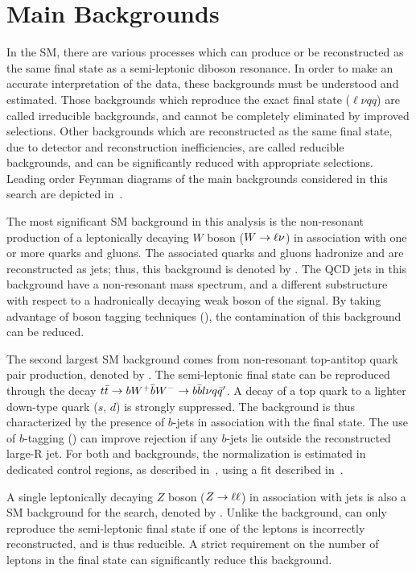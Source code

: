 %
\section{Main Backgrounds}
\label{ch:analysisStrategy:bkgs}
In the SM, there are various processes which can produce or be reconstructed as the same final state as a semi-leptonic diboson resonance. In order to make an accurate interpretation of the data, these backgrounds must be understood and estimated. Those backgrounds which reproduce the exact final state ($\ell\nu qq$) are called irreducible backgrounds, and cannot be completely eliminated by improved selections. Other backgrounds which are reconstructed as the same final state, due to detector and reconstruction inefficiencies, are called reducible backgrounds, and can be significantly reduced with appropriate selections. Leading order Feynman diagrams of the main backgrounds considered in this search are depicted in~\Fig{\ref{fig:bkg_feyn_lo}}.

The most significant SM background in this analysis is the non-resonant production of a leptonically decaying $W$ boson ($W\rightarrow\ell \nu$) in association with one or more quarks and gluons. The associated quarks and gluons hadronize and are reconstructed as jets; thus, this background is denoted by \Wjets. The QCD jets in this background have a non-resonant mass spectrum, and a different substructure with respect to a hadronically decaying weak boson of the signal. By taking advantage of boson tagging techniques (\Sect{\ref{ch:objectReconstruction:larger}}), the contamination of this background can be reduced. 

The second largest SM background comes from non-resonant top-antitop quark pair production, denoted by \ttbar. The semi-leptonic final state can be reproduced through the decay $t\bar{t} \rightarrow bW^+\bar{b}W^- \rightarrow b\bar{b}l\nu q\bar{q}'$. A decay of a top quark to a lighter down-type quark ($s$, $d$) is strongly suppressed.
The \ttbar background is thus characterized by the presence of $b$-jets in association with the final state. The use of $b$-tagging (\Sect{\ref{ch:objectReconstruction:smallr}}) can improve \ttbar rejection if any $b$-jets lie outside the reconstructed large-R jet.  For both \Wjets and \ttbar backgrounds, the normalization is estimated in dedicated control regions, as described in~\Sect{\ref{ch:eventSelection:srcr}}, using a fit described in~\Ch{\ref{ch:stats}}. 

A single leptonically decaying $Z$ boson ($Z\rightarrow \ell\ell$) in association with jets is also a SM background for the search, denoted by \Zjets. Unlike the \Wjets background, \Zjets can only reproduce the semi-leptonic final state if one of the leptons is incorrectly reconstructed, and is thus reducible. A strict requirement on the number of leptons in the final state can significantly reduce this background.

